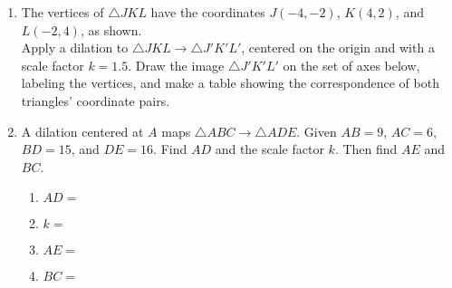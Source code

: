 \documentclass[12pt, twoside]{article}
\begin{document}
\begin{enumerate}
\newpage
\item The vertices of $\triangle JKL$ have the coordinates $J(-4,-2)$, $K(4,2)$, and $L(-2,4)$, as shown. \\[0.25cm]
  Apply a dilation to $\triangle JKL \rightarrow \triangle J'K'L'$, centered on the origin and with a scale factor $k=1.5$. Draw the image $\triangle J'K'L'$ on the set of axes below, labeling the vertices, and make a table showing the correspondence of both triangles' coordinate pairs.
    \begin{flushright}
    \end{flushright}
    
\item A dilation centered at $A$ maps $\triangle ABC \rightarrow \triangle ADE$. Given $AB = 9$, $AC = 6$, $BD = 15$, and $DE = 16$. Find  $AD$ and the scale factor $k$. Then find $AE$ and $BC$. %
  \begin{multicols}{2}
    \begin{enumerate}
      \item $AD=$ \vspace{0.3cm}
      \item $k=$ \vspace{0.3cm}
      \item $AE=$ \vspace{0.3cm}
      \item $BC=$
    \end{enumerate}
    \begin{flushright}
    \end{flushright} 
  \end{multicols}\vspace{1cm}


\end{enumerate}
\end{document}
